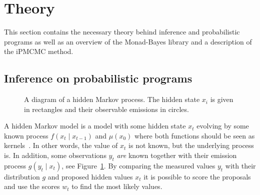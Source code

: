 \section{Theory}

This section contains the necessary theory behind inference and probabilistic programs as well as an overview of the Monad-Bayes library and a description of the iPMCMC method.

\subsection{Inference on probabilistic programs}
\label{sub:inference_on_probabilistic_programs}

\begin{figure}[h!]
\begin{center}
\end{center}
\caption{A diagram of a hidden Markov process. The hidden state $x_i$ is given in rectangles and their observable emissions in circles.}
\label{fig:hmm}
\end{figure}

A hidden Markov model is a model with some hidden state $x_t$ evolving by some known process $f(x_t \mid x_{t-1})$ and $\mu(x_0)$ where both functions should be seen as kernels~\cite{markov}. In other words, the value of $x_t$ is not known, but the underlying process is. In addition, some observations $y_t$ \emph{are} known together with their emission process $g(y_t \mid x_t)$, see Figure~\ref{fig:hmm}. By comparing the measured values $y_t$ with their distribution $g$ and proposed hidden values $x_t$ it is possible to score the proposals and use the scores $w_t$ to find the most likely values.

